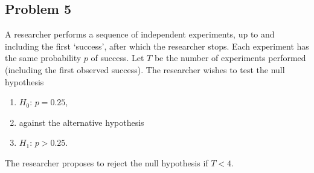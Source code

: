 \documentclass{article}
\newcommand{\1}{\mathbf{1}}
\begin{document}
\subsection*{Problem 5}
A researcher performs a sequence of independent experiments, up to and including the first `success', after which the researcher stops. Each experiment has the same probability $p$ of success. Let $T$ be the number of experiments  performed (including the first observed success). The researcher wishes to test the null hypothesis 
\begin{enumerate}
    \item $H_0$: $p=0.25$, 
    \item against the alternative hypothesis
    \item $H_1$:  $p>0.25$. 
\end{enumerate}
The researcher proposes to reject the null hypothesis if $T<4$.
\end{document}
